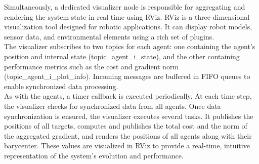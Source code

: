 Simultaneously, a dedicated visualizer node is responsible for aggregating and rendering the system state in real time using RViz. RViz is a three-dimensional visualization tool designed for robotic applications. It can display robot models, sensor data, and environmental elements using a rich set of plugins. \\
The visualizer subscribes to two topics for each agent: one containing the agent's position and internal state (topic\_agent\_i\_state), and the other containing performance metrics such as the cost and gradient norm (topic\_agent\_i\_plot\_info). Incoming messages are buffered in FIFO queues to enable synchronized data processing. \\
As with the agents, a timer callback is executed periodically. At each time step, the visualizer checks for synchronized data from all agents. Once data synchronization is ensured, the visualizer executes several tasks. It publishes the positions of all targets, computes and publishes the total cost and the norm of the aggregated gradient, and renders the positions of all agents along with their barycenter. These values are visualized in RViz to provide a real-time, intuitive representation of the system's evolution and performance.


